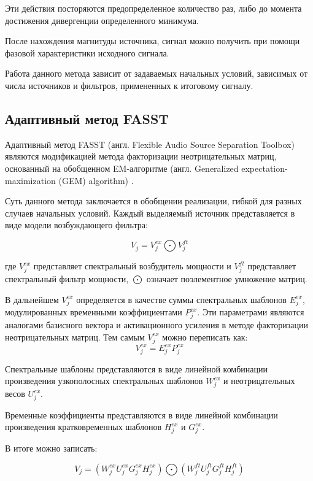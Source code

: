 Эти действия посторяются предопределенное количество раз, либо до момента достижения дивергенции определенного минимума.

После нахождения магнитуды источника, сигнал можно получить при помощи фазовой характеристики исходного сигнала. 

Работа данного метода зависит от задаваемых начальных условий, зависимых от числа источников и фильтров, примененных к итоговому сигналу.

\subsection{Адаптивный метод FASST}

Адаптивный метод FASST (англ. Flexible Audio Source Separation Toolbox) являются модификацией метода факторизации неотрицательных матриц, основанный на обобщенном EM-алгоритме (англ. Generalized expectation-maximization (GEM) algorithm) \cite{ozerov}. 

Суть данного метода заключается в обобщении реализации, гибкой для разных случаев начальных условий. Каждый выделяемый источник представляется в виде модели возбуждающего фильтра:

\begin{equation}
V_j = V_j^{ex} \bigodot V_j^{ft}
\end{equation}

где $V_j^{ex}$ представляет спектральный возбудитель мощности и $V_j^{ft}$ представляет спектральный фильтр мощности, $\bigodot$ означает поэлементное умножение матриц.

В дальнейшем $V_j^{ex}$ определяется в качестве суммы спектральных шаблонов $E_j^{ex}$, модулированных 	временными коэффициентами $P_j^{ex}$. Эти параметрами являются аналогами базисного вектора и активационного усиления в методе факторизации неотрицательных матриц. Тем самым $V_j^{ex}$ можно переписать как:
\begin{equation}
V_j^{ex} = E_j^{ex}P_j^{ex}
\end{equation}

Спектральные шаблоны представляются в виде линейной комбинации произведения узкополосных спектральных шаблонов $W_j^{ex}$ и неотрицательных весов $U_j^{ex}$.

Временные коэффициенты представляются в виде линейной комбинации произведения кратковременных шаблонов $H_j^{ex}$ и $G_j^{ex}$.

В итоге можно записать:

\begin{equation}
V_j = (W_j^{ex}U_j^{ex}G_j^{ex}H_j^{ex}) \bigodot (W_j^{ft}U_j^{ft}G_j^{ft}H_j^{ft})
\end{equation}

